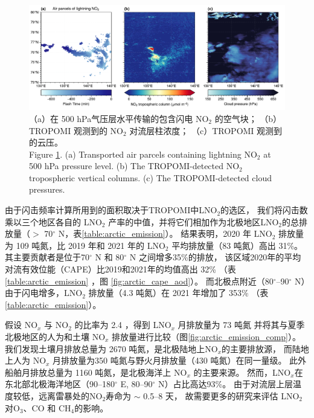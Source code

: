 \begin{figure}[!htbp]
\centering
\includegraphics[width=15cm]{./figures/arctic_large_lno2.pdf}
\caption{
（a）在 500 hPa气压层水平传输的包含闪电 NO$_2$ 的空气块；
（b）TROPOMI 观测到的 NO$_2$ 对流层柱浓度；
（c）TROPOMI 观测到的云压。\\
Figure \ref{fig:arctic_large_lno2}. (a) Transported air parcels containing lightning NO$_2$ at 500 hPa pressure level.
(b) The TROPOMI-detected NO$_2$ tropospheric vertical columns.
(c) The TROPOMI-detected cloud pressures.
}
\label{fig:arctic_large_lno2}
\end{figure}


由于闪击频率计算所用到的面积取决于TROPOMI中LNO$_2$的选区，
我们将闪击数乘以三个地区各自的 LNO$_2$ 产率的中值，并将它们相加作为北极地区LNO$_2$的总排放量（$>$ 70$^{\circ}$ N，表\ref{table:arctic_emission}）。
结果表明，2020 年 LNO$_2$ 排放量为 109 吨氮，比 2019 年和 2021 年的 LNO$_2$ 平均排放量（83 吨氮）高出 31\%。
其主要贡献者是位于70$^{\circ}$ N 和 80$^{\circ}$ N 之间增多35\%的排放，
该区域2020年的平均对流有效位能（CAPE）比2019和2021年的均值高出 32\%
（表\ref{table:arctic_emission} ，图 \ref{fig:arctic_cape_aod}）。
而北极点附近（80$^{\circ}$--90$^{\circ}$ N）由于闪电增多，LNO$_2$ 排放量（4.3 吨氮）在 2021 年增加了 353\% （表 \ref{table:arctic_emission}）。

假设 NO$_x$ 与 NO$_2$ 的比率为 2.4 \citep{Silvern.2018}，得到 LNO$_x$ 月排放量为 73 吨氮
并将其与夏季北极地区的人为和土壤 NO$_x$ 排放量进行比较（图\ref{fig:arctic_emission_comp}）。
我们发现土壤月排放总量为 2670 吨氮，是北极陆地上NO$_x$的主要排放源，
而陆地上人为 NO$_x$ 月排放量为350 吨氮与野火月排放量（430 吨氮）在同一量级。
此外船舶月排放总量为 1160 吨氮，是北极海洋上 NO$_x$ 的主要来源。
然而，LNO$_x$在东北部北极海洋地区（90--180$^{\circ}$ E, 80--90$^{\circ}$ N）占比高达93\%。
由于对流层上层温度较低，远离雷暴处的NO$_2$寿命为 $\sim$ 0.5--8 天\citep{Schumann.2007,Nault.2017}，
故需要更多的研究来评估 LNO$_2$对O$_3$、CO 和 CH$_4$的影响。


